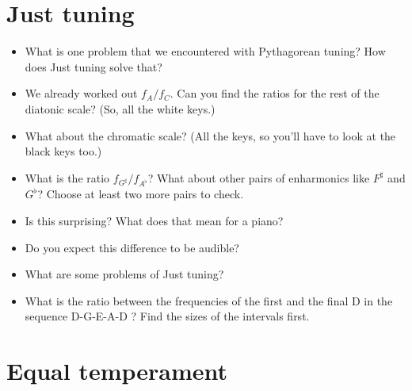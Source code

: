 \documentclass[a4paper, 11pt]{article}
\begin{document}
\section{Just tuning}

\begin{itemize}
    \item What is one problem that we encountered with Pythagorean tuning? How does Just tuning solve that?
    \item We already worked out $f_A/f_C$. Can you find the ratios for the rest of the diatonic scale? (So, all the white keys.)
    \item What about the chromatic scale? (All the keys, so you'll have to look at the black keys too.)
    \item  What is the ratio $f_{G^\sharp}/f_{A^\flat}$? What about other pairs of enharmonics like $F^\sharp$ and $G^\flat$? Choose at least two more pairs to check.
    \item Is this surprising? What does that mean for a piano?
    \item Do you expect this difference to be audible?
    \item What are some problems of Just tuning?
    \item What is the ratio between the frequencies of the first and the final D in the sequence D-G-E-A-D ? Find the sizes of the intervals first.
\end{itemize}

\section{Equal temperament}
\end{document}
